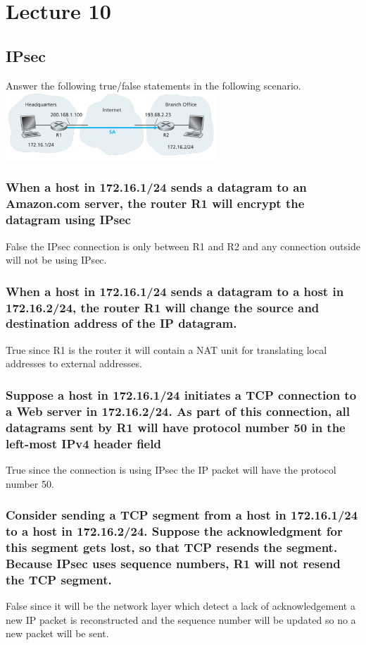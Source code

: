 \documentclass[12pt, a4paper]{article}
\begin{document}
	\section{Lecture 10}
		\subsection{IPsec}
			Answer the following true/false statements in the following scenario.\\
			\includegraphics[width=300px]{assets/10.2.png}\\
			\subsubsection{When a host in 172.16.1/24 sends a datagram to an Amazon.com server, the router R1 will encrypt the datagram using IPsec}
				False the IPsec connection is only between R1 and R2 and any connection outside will not be using IPsec.
			\subsubsection{When a host in 172.16.1/24 sends a datagram to a host in 172.16.2/24, the router R1 will change the source and destination address of the IP datagram.}
				True since R1 is the router it will contain a NAT unit for translating local addresses to external addresses.
			\subsubsection{Suppose a host in 172.16.1/24 initiates a TCP connection to a Web server in 172.16.2/24. As part of this connection, all datagrams sent by R1 will have protocol number 50 in the left-most IPv4 header field}
				True since the connection is using IPsec the IP packet will have the protocol number 50.
			\subsubsection{ Consider sending a TCP segment from a host in 172.16.1/24 to a host in 172.16.2/24. Suppose the acknowledgment for this segment gets lost, so that TCP resends the segment. Because IPsec uses sequence numbers, R1 will not resend the TCP segment.}
				False since it will be the network layer which detect a lack of acknowledgement a new IP packet is reconstructed and the sequence number will be updated so no a new packet will be sent.
\end{document}
